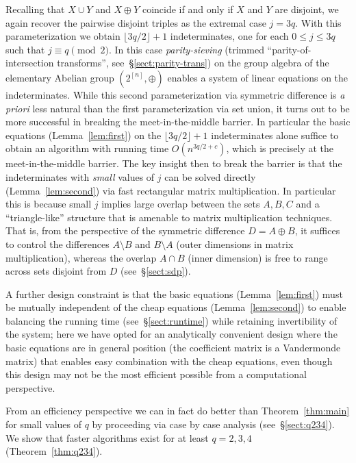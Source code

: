 \documentclass{amsart}
\begin{document}
Recalling that $X\cup Y$ and $X\oplus Y$ coincide if and only if $X$ and $Y$ are disjoint, we again 
recover the pairwise disjoint triples as the extremal case $j=3q$. 
With this parameterization we obtain $\lfloor 3q/2\rfloor+1$ indeterminates,
one for each $0\leq j\leq 3q$ such that $j\equiv q\pmod 2$.
In this case {\em parity-sieving} 
(trimmed ``parity-of-intersection transforms'', 
see~\S\ref{sect:parity-trans}) on the group algebra of the 
elementary Abelian group $(2^{[n]},\oplus)$ enables a system of linear 
equations on the indeterminates. While this second parameterization via 
symmetric difference is {\em a priori} less natural than the 
first parameterization via set union, it turns out to be more successful 
in breaking the meet-in-the-middle barrier. In particular the basic 
equations (Lemma~\ref{lem:first}) on the $\lfloor 3q/2\rfloor+1$ indeterminates
alone suffice to obtain an algorithm with running time $O(n^{3q/2+c})$,
which is precisely at the meet-in-the-middle barrier.
The key insight then to break the barrier is that the indeterminates with 
{\em small} values of $j$ can be solved directly (Lemma~\ref{lem:second}) via 
fast rectangular matrix multiplication. In particular this is because small 
$j$ implies large overlap between the sets $A,B,C$ and a 
``triangle-like'' structure that is amenable to matrix multiplication 
techniques. That is, from the perspective of the symmetric difference 
$D=A\oplus B$, it suffices to control the differences $A\setminus B$ and 
$B\setminus A$ (outer dimensions in matrix multiplication), whereas the 
overlap $A\cap B$ (inner dimension) is free to range across sets disjoint 
from $D$ (see~\S\ref{sect:sdp}). 

A further design constraint is that the basic equations (Lemma~\ref{lem:first})
must be mutually independent of the cheap equations (Lemma~\ref{lem:second})
to enable balancing the running time (see~\S\ref{sect:runtime}) 
while retaining invertibility of the system; here we have opted for an 
analytically convenient design where the basic equations are in general 
position (the coefficient matrix is a Vandermonde matrix) that enables easy 
combination with the cheap equations, even though this design may not be 
the most efficient possible from a computational perspective. 

From an efficiency perspective we can in fact do better than 
Theorem~\ref{thm:main} for small values of $q$ by proceeding 
via case by case analysis (see~\S\ref{sect:q234}). 
We show that faster algorithms exist for at least $q=2,3,4$ 
(Theorem~\ref{thm:q234}). 
\end{document}
